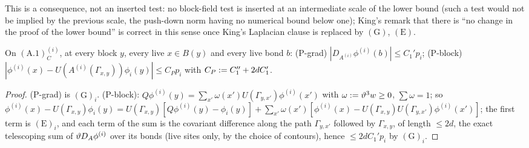 This is a consequence, not an inserted test: no block-field test is inserted at an intermediate scale of the lower bound (such a test would not be implied by the previous scale, the push-down norm having no numerical bound below one); King's remark that there is ``no change in the proof of the lower bound'' \cite[p.~343]{K2} is correct in this sense once King's Laplacian clause is replaced by $(\mathrm G)$, $(\mathrm E)$.

\begin{lemma}[the two properties consumed by the $n+n'=1$ vertices]\label{lem:a01:PC}
On $(\mathrm{A.1})^{(i)}_C$, at every block $y$, every live $x\in B(y)$ and every live bond $b$: (P-grad) $|D_{A^{(i)}}\phi^{(i)}(b)|\le C_1'p_i$; (P-block) $|\phi^{(i)}(x)-U(A^{(i)}(\Gamma_{x,y}))\phi_i(y)|\le C_Pp_i$ with $C_P:= C_1''+2dC_1'$.
\end{lemma}
\begin{proof}
(P-grad) is $(\mathrm G)_i$. (P-block): $Q\phi^{(i)}(y)=\sum_{x'}\omega(x')U(\Gamma_{y,x'})\phi^{(i)}(x')$ with $\omega:=\vartheta^3w\ge0$, $\sum\omega=1$; so $\phi^{(i)}(x)-U(\Gamma_{x,y})\phi_i(y)=U(\Gamma_{x,y})[Q\phi^{(i)}(y)-\phi_i(y)]+\sum_{x'}\omega(x')[\phi^{(i)}(x)-U(\Gamma_{x,y})U(\Gamma_{y,x'})\phi^{(i)}(x')]$; the first term is $(\mathrm E)_i$, and each term of the sum is the covariant difference along the path $\Gamma_{y,x'}$ followed by $\Gamma_{x,y}$, of length $\le2d$, the exact telescoping sum of $\vartheta D_A\phi^{(i)}$ over its bonds (live sites only, by the choice of contours), hence $\le2dC_1'p_i$ by $(\mathrm G)_i$.
\end{proof}

